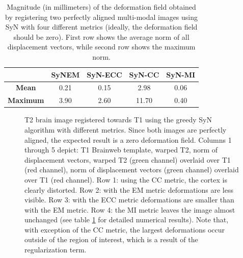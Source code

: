 \begin{table}[htbp]
  \centering
  {\small
    \begin{tabular}{ccccc}
    \toprule
    \textbf{} & \textbf{SyNEM} & \textbf{SyN-ECC} & \textbf{SyN-CC} &\textbf{SyN-MI} \\
    \midrule
    \textbf{Mean}    & 0.21 & 0.15 &  2.98 & 0.06 \\
    \textbf{Maximum} & 3.90 & 2.60 & 11.70 &  0.40\\
    \bottomrule
    \end{tabular}%
    \caption{Magnitude (in millimeters) of the deformation field obtained by registering two perfectly aligned multi-modal images using SyN with four different metrics (ideally, the deformation field should be zero). First row shows the average norm of all displacement
    vectors, while second row shows the maximum norm.}
  \label{tab:deformation_magnitude}}%
\end{table}%


\begin{figure}[H]
\centering
{}
\caption{T2 brain image registered towards T1 using the greedy SyN algorithm with different metrics. Since both images are perfectly aligned, the expected result is a zero deformation field.
Columns 1 through 5 depict: T1 Brainweb template, warped T2, norm of displacement vectors, warped T2 (green channel) overlaid over T1 (red channel), norm of displacement vectors
(green channel) overlaid over T1 (red channel). Row 1: using the CC metric, the cortex is clearly distorted. Row 2: with the EM metric deformations are less visible. Row 3: with the ECC metric deformations are smaller than with the EM metric. Row 4: the MI metric leaves the image almost unchanged (see table \ref{tab:deformation_magnitude} for detailed numerical results). Note that, with exception of the CC metric, the largest deformations occur outside of the region of interest, which is a result of the regularization term.}
\label{fig:t1_t2_reg_pannel}
\end{figure}

